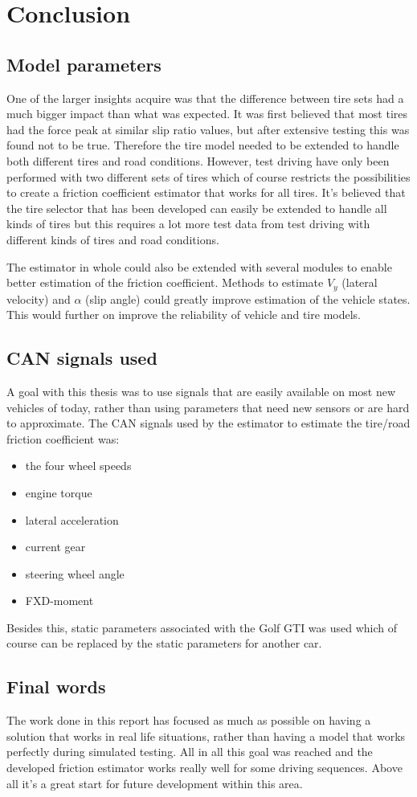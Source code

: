 \chapter{Conclusion}
\section{Model parameters}
One of the larger insights acquire was that the difference between tire sets had a much bigger impact than what was expected. It was first believed that most tires had the force peak at similar slip ratio values, but after extensive testing this was found not to be true. Therefore the tire model needed to be extended to handle both different tires and road conditions. However, test driving have only been performed with two different sets of tires which of course restricts the possibilities to create a friction coefficient estimator that works for all tires. It's believed that the tire selector that has been developed can easily be extended to handle all kinds of tires but this requires a lot more test data from test driving with different kinds of tires and road conditions.

The estimator in whole could also be extended with several modules to enable better estimation of the friction coefficient. Methods to estimate $ V_{y} $ (lateral velocity) and $ \alpha $ (slip angle) could greatly improve estimation of the vehicle states. This would further on improve the reliability of vehicle and tire models.

\section{CAN signals used}
A goal with this thesis was to use signals that are easily available on most new vehicles of today, rather than using parameters that need new sensors or are hard to approximate. The CAN signals used by the estimator to estimate the tire/road friction coefficient was:
\begin{itemize}
	\item the four wheel speeds
	\item engine torque
	\item lateral acceleration
	\item current gear
	\item steering wheel angle
	\item FXD-moment
\end{itemize}
Besides this, static parameters associated with the Golf GTI was used which of course can be replaced by the static parameters for another car.  

\section{Final words}
The work done in this report has focused as much as possible on having a solution that works in real life situations, rather than having a model that works perfectly during simulated testing. All in all this goal was reached and the developed friction estimator works really well for some driving sequences. Above all it's a great start for future development within this area.